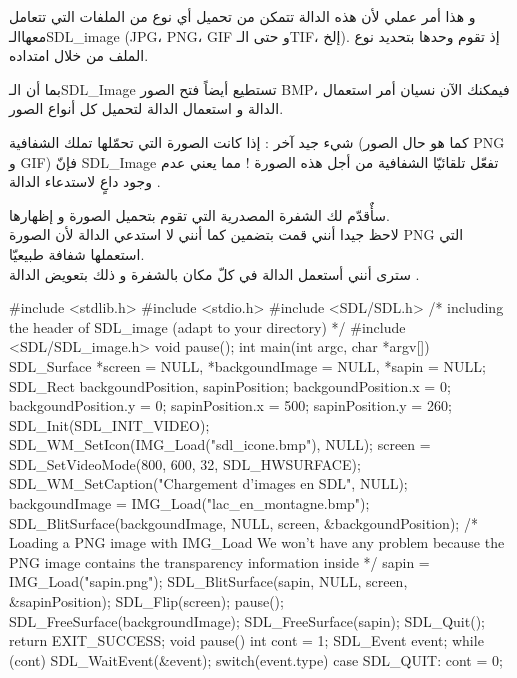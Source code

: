 و هذا أمر عملي لأن هذه الدالة تتمكن من تحميل أي نوع من الملفات التي تتعامل معهاالـ\textenglish{SDL\_image}
(\textenglish{JPG}، \textenglish{PNG}، \textenglish{GIF}
و حتى الـ\textenglish{TIF}،
إلخ). إذ تقوم وحدها بتحديد نوع الملف من خلال امتداده.
\begin{question}
بما أن الـ\textenglish{SDL\_Image}
تستطيع أيضاً فتح الصور 
\textenglish{BMP}،
فيمكنك الآن نسيان أمر استعمال الدالة 
و استعمال الدالة 
لتحميل كل أنواع الصور.
\end{question}

شيء جيد آخر : إذا كانت الصورة التي تحمّلها تملك الشفافية (كما هو حال الصور 
\textenglish{PNG}
و
\textenglish{GIF})
 فإنّ
\textenglish{SDL\_Image}
تفعّل تلقائيّا الشفافية من أجل هذه الصورة ! مما يعني عدم وجود داعٍ لاستدعاء الدالة 
.

سأٌقدّم لك الشفرة المصدرية التي تقوم بتحميل الصورة 
و إظهارها.\\
لاحظ جيدا أنني قمت بتضمين
كما أنني لا استدعي الدالة 
لأن الصورة
\textenglish{PNG}
التي استعملها شفافة طبيعيّا.\\
سترى أنني أستعمل الدالة 
في كلّ مكان بالشفرة و ذلك بتعويض الدالة 
.

\begin{Csource}
#include <stdlib.h>
#include <stdio.h>
#include <SDL/SDL.h>
/* including the header of SDL_image (adapt to your directory) */
#include <SDL/SDL_image.h> 
void pause();
int main(int argc, char *argv[])
{
	SDL_Surface *screen = NULL, *backgoundImage = NULL, *sapin = NULL;
	SDL_Rect backgoundPosition, sapinPosition;
	backgoundPosition.x = 0;
	backgoundPosition.y = 0;
	sapinPosition.x = 500;
	sapinPosition.y = 260;
	SDL_Init(SDL_INIT_VIDEO);
	SDL_WM_SetIcon(IMG_Load("sdl_icone.bmp"), NULL);
	screen = SDL_SetVideoMode(800, 600, 32, SDL_HWSURFACE);
	SDL_WM_SetCaption("Chargement d'images en SDL", NULL);
	backgoundImage = IMG_Load("lac_en_montagne.bmp");
	SDL_BlitSurface(backgoundImage, NULL, screen, &backgoundPosition);
	/* Loading a PNG image with IMG_Load
	We won't have any problem because the PNG image contains the transparency information inside */
	sapin = IMG_Load("sapin.png");
	SDL_BlitSurface(sapin, NULL, screen, &sapinPosition); 
	SDL_Flip(screen);
	pause();
	SDL_FreeSurface(backgroundImage);
	SDL_FreeSurface(sapin);
	SDL_Quit();
	return EXIT_SUCCESS;
} 
void pause()
{
	int cont = 1;
	SDL_Event event;
	while (cont)
	{
		SDL_WaitEvent(&event);
		switch(event.type)
		{
			case SDL_QUIT:
			cont = 0;
		}
	}
}
\end{Csource}

